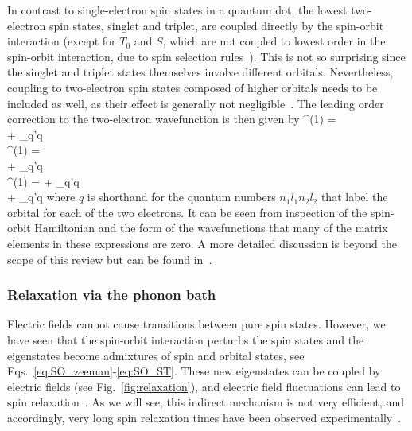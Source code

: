 \documentclass[12pt,aps,nofootinbib]{revtex4-1}
\begin{document}
In contrast to single-electron spin states in a quantum dot, the
lowest two-electron spin states, singlet and triplet, are coupled
directly by the spin-orbit interaction (except for $T_0$ and $S$,
which are not coupled to lowest order in the spin-orbit
interaction, due to spin selection
rules~\cite{dickmann03,sasaki05,golovach07,florescu06,climente06}). This is not so surprising since the singlet and triplet states
themselves involve different orbitals. Nevertheless, coupling to
two-electron spin states composed of higher orbitals needs to be
included as well, as their effect is generally not 
negligible~\cite{golovach07,climente06}. The leading order correction
to the two-electron wavefunction is then given by 
\bea
{}^{(1)} =  \hspace*{3.5cm} \nonumber \\
+ \sum_{q'\neq q}  \\
^{(1)} =  \hspace*{3.5cm} \nonumber \\
+ \sum_{q'\neq q}  \\
^{(1)} = 
+ \sum_{q'\neq q}   \nonumber \\
+ \sum_{q'\neq q}  
\label{eq:SO_ST} 
\eea 
where $q$ is shorthand for the quantum
numbers $n_1 l_1 n_2 l_2$ that label the orbital for each of the
two electrons. It can be seen from inspection of the spin-orbit
Hamiltonian and the form of the wavefunctions that many of the
matrix elements in these expressions are zero. A more detailed
discussion is beyond the scope of this review but can be found
in~\textcite{golovach07,climente06}.


\subsubsection{Relaxation via the phonon bath}
\label{Sec:RelaxationviaPhononBath}
Electric fields cannot cause transitions between pure spin states.
However, we have seen that the spin-orbit interaction perturbs the
spin states and the eigenstates become admixtures of spin and
orbital states, see Eqs.~\ref{eq:SO_zeeman}-\ref{eq:SO_ST}. These
new eigenstates can be coupled by electric fields (see
Fig.~\ref{fig:relaxation}), and electric field fluctuations can
lead to spin relaxation~\cite{khaetskii00,khaetskii01,woods02}. As
we will see, this indirect mechanism is not very efficient, and
accordingly, very long spin relaxation times have been observed
experimentally~\cite{FujisawaPRB2001,FujisawaNature2002,HansonPRL2003,ElzermanNature2004,kroutvar04,HansonPRL2005,sasaki05,meunier07,amasha06}.
\end{document}
